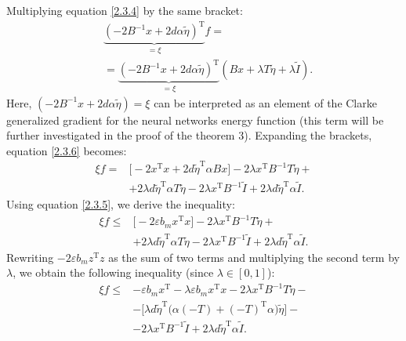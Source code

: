\documentclass[journal]{IEEEtran}
\begin{document}
\begin{IEEEproof}
Multiplying equation \eqref{2.3.4} by the same bracket:
\begin{equation}\label{2.3.6}
\begin{aligned}&
\underbrace{(-2B^{-1}x+2d \alpha\widetilde\eta)^\mathrm{T}}_{=\xi} f  =\\&= \underbrace{(-2B^{-1}x+2d \alpha\widetilde\eta)^\mathrm{T}}_{=\xi}(Bx + \lambda T \widetilde{\eta} + \lambda \widetilde I ).    
\end{aligned}
\end{equation}
Here, $(-2B^{-1}x+2d\alpha\widetilde{\eta}) = \xi$ can be interpreted as an element of the Clarke generalized gradient \cite{p14} for the neural networks energy function (this term will be further investigated in the proof of the theorem 3). Expanding the brackets, equation \eqref{2.3.6} becomes:
\begin{equation*}\label{2.3.7} 
\begin{aligned}\xi f  = & \big[-2 x^{\mathrm{T}} x + 2 d \widetilde{\eta}^\mathrm{T}  \alpha Bx\big] - 2 \lambda x^{\mathrm{T}} B^{-1} T \widetilde{\eta} +\\ & +2 \lambda d  \widetilde{\eta}^\mathrm{T} \alpha T \widetilde{\eta} - 2 \lambda x^\mathrm{T} B^{-1} \widetilde I + 2\lambda d \widetilde\eta^\mathrm{T} \alpha \widetilde I .\end{aligned}   
\end{equation*}
Using equation \eqref{2.3.5}, we derive the inequality:
\begin{equation*}\label{2.3.8} 
\begin{aligned} \xi f  \leqslant & \big[-2 \varepsilon b_m x^\mathrm{T} x \big]- 2 \lambda x^{\mathrm{T}} B^{-1} T \widetilde{\eta} +\\ & +2 \lambda d  \widetilde{\eta}^\mathrm{T} \alpha T \widetilde{\eta} - 2 \lambda x^\mathrm{T} B^{-1} \widetilde I + 2\lambda d \widetilde\eta^\mathrm{T} \alpha \widetilde I.
\end{aligned}      
\end{equation*} 
Rewriting $-2\varepsilon b_m z^{\mathrm{T}}z$ as the sum of two terms and multiplying the second term by $\lambda$, we obtain the following inequality (since $\lambda \in [0,1]$):  
\begin{equation}\label{2.3.9}
\begin{aligned}\xi f \leqslant & - \varepsilon b_m x^\mathrm{T} - \lambda \varepsilon b_m x^\mathrm{T} x - 2 \lambda x^{\mathrm{T}} B^{-1} T \widetilde{\eta} -\\ & -\big[ \lambda d \widetilde\eta^\mathrm{T}\big (\alpha(-T) +(-T)^\mathrm{T}\alpha\big)\widetilde\eta\big]- \\ &-2 \lambda x^\mathrm{T} B^{-1} \widetilde I + 2\lambda d \widetilde\eta^\mathrm{T} \alpha \widetilde I.

\end{aligned}
\end{equation}
\end{IEEEproof}
\end{document}
